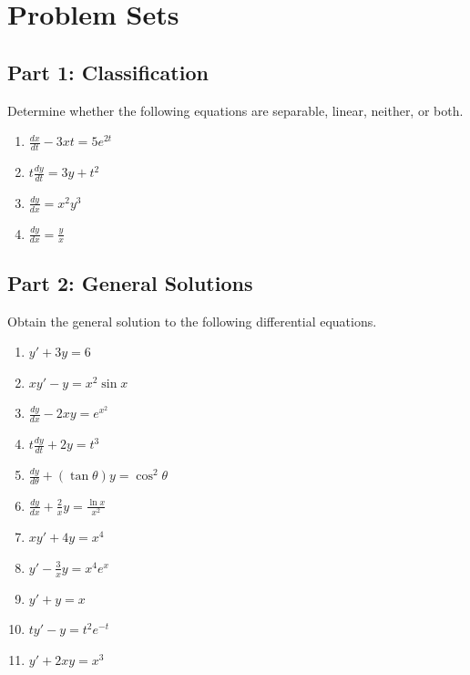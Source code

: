 \documentclass[11pt]{article}
\begin{document}
\newpage

\section{Problem Sets}

\subsection*{Part 1: Classification}
Determine whether the following equations are separable, linear, neither, or both.
\begin{enumerate}[label=\textbf{\arabic*.}]
    \item $\displaystyle \frac{dx}{dt} - 3xt = 5e^{2t}$
    \item $\displaystyle t \frac{dy}{dt} = 3y + t^2$
    \item $\displaystyle \frac{dy}{dx} = x^2 y^3$
    \item $\displaystyle \frac{dy}{dx} = \frac{y}{x}$
\end{enumerate}

\subsection*{Part 2: General Solutions}
Obtain the general solution to the following differential equations.
\begin{enumerate}[label=\textbf{\arabic*.}, start=5]
    \item $\displaystyle y' + 3y = 6$
    \item $\displaystyle x y' - y = x^2 \sin x$
    \item $\displaystyle \frac{dy}{dx} - 2xy = e^{x^2}$
    \item $\displaystyle t \frac{dy}{dt} + 2y = t^3$
    \item $\displaystyle \frac{dy}{d\theta} + (\tan \theta)y = \cos^2 \theta$
    \item $\displaystyle \frac{dy}{dx} + \frac{2}{x}y = \frac{\ln x}{x^2}$
    \item $\displaystyle x y' + 4y = x^4$
    \item $\displaystyle y' - \frac{3}{x}y = x^4 e^x$
    \item $\displaystyle y' + y = x$
    \item $\displaystyle t y' - y = t^2 e^{-t}$
    \item $\displaystyle y' + 2xy = x^3$
\end{enumerate}
\end{document}
